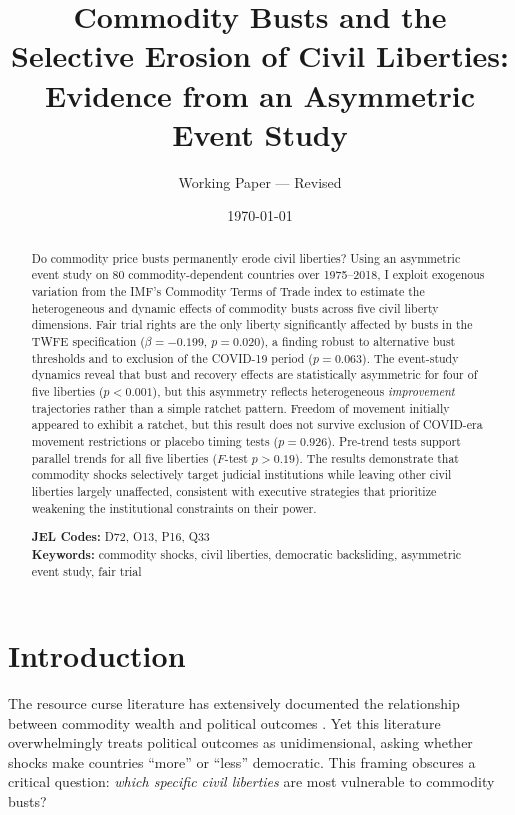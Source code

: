 \documentclass[12pt]{article}
\title{Commodity Busts and the Selective Erosion of Civil Liberties:\\Evidence from an Asymmetric Event Study}
\author{Working Paper --- Revised}
\date{\today}
\begin{document}
\maketitle

\begin{abstract}
Do commodity price busts permanently erode civil liberties? Using an asymmetric event study on 80 commodity-dependent countries over 1975--2018, I exploit exogenous variation from the IMF's Commodity Terms of Trade index to estimate the heterogeneous and dynamic effects of commodity busts across five civil liberty dimensions. Fair trial rights are the only liberty significantly affected by busts in the TWFE specification ($\beta = -0.199$, $p = 0.020$), a finding robust to alternative bust thresholds and to exclusion of the COVID-19 period ($p = 0.063$). The event-study dynamics reveal that bust and recovery effects are statistically asymmetric for four of five liberties ($p < 0.001$), but this asymmetry reflects heterogeneous \textit{improvement} trajectories rather than a simple ratchet pattern. Freedom of movement initially appeared to exhibit a ratchet, but this result does not survive exclusion of COVID-era movement restrictions or placebo timing tests ($p = 0.926$). Pre-trend tests support parallel trends for all five liberties ($F$-test $p > 0.19$). The results demonstrate that commodity shocks selectively target judicial institutions while leaving other civil liberties largely unaffected, consistent with executive strategies that prioritize weakening the institutional constraints on their power.

\medskip
\noindent\textbf{JEL Codes:} D72, O13, P16, Q33 \\
\textbf{Keywords:} commodity shocks, civil liberties, democratic backsliding, asymmetric event study, fair trial
\end{abstract}

\newpage

\section{Introduction}

The resource curse literature has extensively documented the relationship between commodity wealth and political outcomes \citep{ross2015, tsui2011, aslaksen2010}. Yet this literature overwhelmingly treats political outcomes as unidimensional, asking whether shocks make countries ``more'' or ``less'' democratic. This framing obscures a critical question: \textit{which specific civil liberties} are most vulnerable to commodity busts?
\end{document}

